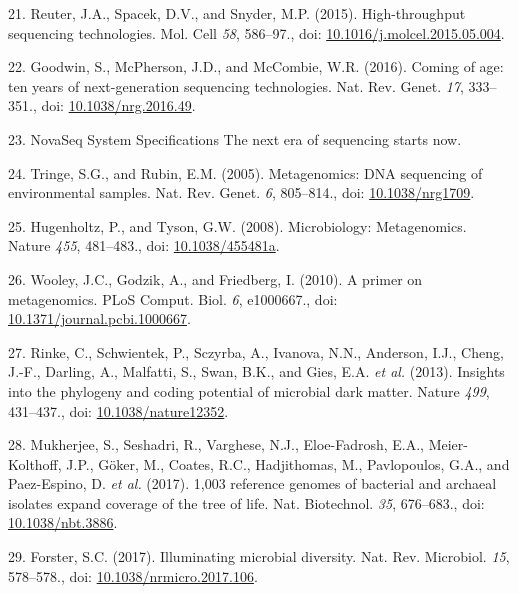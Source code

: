 \documentclass[11pt,a4paper,twoside]{book}
\theoremstyle{definition}
\theoremstyle{definition}
\theoremstyle{remark}
\begin{document}
\hypertarget{ref-Reuter2015}{}
21. Reuter, J.A., Spacek, D.V., and Snyder, M.P. (2015). High-throughput
sequencing technologies. Mol. Cell \emph{58}, 586--97., doi:
\href{https://doi.org/10.1016/j.molcel.2015.05.004}{10.1016/j.molcel.2015.05.004}.

\hypertarget{ref-Goodwin2016}{}
22. Goodwin, S., McPherson, J.D., and McCombie, W.R. (2016). Coming of
age: ten years of next-generation sequencing technologies. Nat. Rev.
Genet. \emph{17}, 333--351., doi:
\href{https://doi.org/10.1038/nrg.2016.49}{10.1038/nrg.2016.49}.

\hypertarget{ref-NovaSeqSystemSpecifications}{}
23. NovaSeq System Specifications \textbar{} The next era of sequencing
starts now.

\hypertarget{ref-Tringe2005}{}
24. Tringe, S.G., and Rubin, E.M. (2005). Metagenomics: DNA sequencing
of environmental samples. Nat. Rev. Genet. \emph{6}, 805--814., doi:
\href{https://doi.org/10.1038/nrg1709}{10.1038/nrg1709}.

\hypertarget{ref-Hugenholtz2008}{}
25. Hugenholtz, P., and Tyson, G.W. (2008). Microbiology: Metagenomics.
Nature \emph{455}, 481--483., doi:
\href{https://doi.org/10.1038/455481a}{10.1038/455481a}.

\hypertarget{ref-Wooley2010}{}
26. Wooley, J.C., Godzik, A., and Friedberg, I. (2010). A primer on
metagenomics. PLoS Comput. Biol. \emph{6}, e1000667., doi:
\href{https://doi.org/10.1371/journal.pcbi.1000667}{10.1371/journal.pcbi.1000667}.

\hypertarget{ref-Rinke2013}{}
27. Rinke, C., Schwientek, P., Sczyrba, A., Ivanova, N.N., Anderson,
I.J., Cheng, J.-F., Darling, A., Malfatti, S., Swan, B.K., and Gies,
E.A. \emph{et al.} (2013). Insights into the phylogeny and coding
potential of microbial dark matter. Nature \emph{499}, 431--437., doi:
\href{https://doi.org/10.1038/nature12352}{10.1038/nature12352}.

\hypertarget{ref-Mukherjee2017}{}
28. Mukherjee, S., Seshadri, R., Varghese, N.J., Eloe-Fadrosh, E.A.,
Meier-Kolthoff, J.P., Göker, M., Coates, R.C., Hadjithomas, M.,
Pavlopoulos, G.A., and Paez-Espino, D. \emph{et al.} (2017). 1,003
reference genomes of bacterial and archaeal isolates expand coverage of
the tree of life. Nat. Biotechnol. \emph{35}, 676--683., doi:
\href{https://doi.org/10.1038/nbt.3886}{10.1038/nbt.3886}.

\hypertarget{ref-Forster2017}{}
29. Forster, S.C. (2017). Illuminating microbial diversity. Nat. Rev.
Microbiol. \emph{15}, 578--578., doi:
\href{https://doi.org/10.1038/nrmicro.2017.106}{10.1038/nrmicro.2017.106}.
\end{document}
